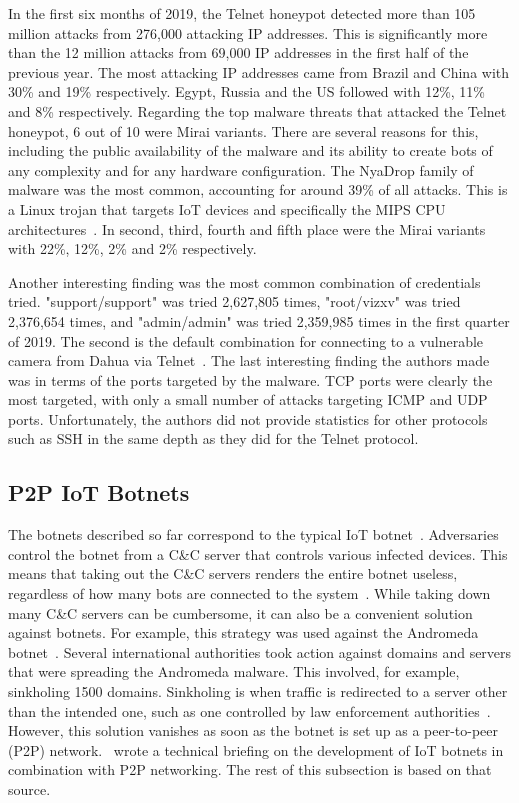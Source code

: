 In the first six months of 2019, the Telnet honeypot detected more than 105 million attacks from 276,000 attacking IP addresses. This is significantly more than the 12 million attacks from 69,000 IP addresses in the first half of the previous year. The most attacking IP addresses came from Brazil and China with 30\% and 19\% respectively. Egypt, Russia and the US followed with 12\%, 11\% and 8\% respectively. Regarding the top malware threats that attacked the Telnet honeypot, 6 out of 10 were Mirai variants. There are several reasons for this, including the public availability of the malware and its ability to create bots of any complexity and for any hardware configuration. The NyaDrop family of malware was the most common, accounting for around 39\% of all attacks. This is a Linux trojan that targets IoT devices and specifically the MIPS CPU architectures~\cite{website:comodoAntivirus}. In second, third, fourth and fifth place were the Mirai variants with 22\%, 12\%, 2\% and 2\% respectively. 

Another interesting finding was the most common combination of credentials tried. "support/support" was tried 2,627,805 times, "root/vizxv" was tried 2,376,654 times, and "admin/admin" was tried 2,359,985 times in the first quarter of 2019. The second is the default combination for connecting to a vulnerable camera from Dahua via Telnet~\cite{website:dahuaDefault}. The last interesting finding the authors made was in terms of the ports targeted by the malware. TCP ports were clearly the most targeted, with only a small number of attacks targeting ICMP and UDP ports. Unfortunately, the authors did not provide statistics for other protocols such as SSH in the same depth as they did for the Telnet protocol.  


\subsection{P2P IoT Botnets} \label{subsection:P2PIoTBotnets}
The botnets described so far correspond to the typical IoT botnet~\cite{website:trendmicroTheFuture}. Adversaries control the botnet from a C\&C server that controls various infected devices. This means that taking out the C\&C servers renders the entire botnet useless, regardless of how many bots are connected to the system~\cite{website:trendmicroTheFuture}. While taking down many C\&C servers can be cumbersome, it can also be a convenient solution against botnets. For example, this strategy was used against the Andromeda botnet~\cite{website:europol}. Several international authorities took action against domains and servers that were spreading the Andromeda malware. This involved, for example, sinkholing  1500 domains. Sinkholing is when traffic is redirected to a server other than the intended one, such as one controlled by law enforcement authorities~\cite{website:europol}. 
However, this solution vanishes as soon as the botnet is set up as a peer-to-peer (P2P) network.~\cite{website:trendMicroUncleanable} wrote a technical briefing on the development of IoT botnets in combination with P2P networking. The rest of this subsection is based on that source.

